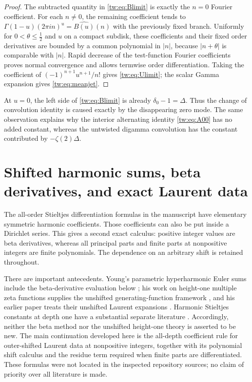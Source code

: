 \documentclass[11pt,letterpaper]{article}
\numberwithin{equation}{section}
\theoremstyle{plain}
\theoremstyle{definition}
\theoremstyle{remark}
\begin{document}
\begin{proof}
The subtracted quantity in \eqref{tw:eq:Blimit} is exactly the
$n=0$ Fourier coefficient. For each $n\ne0$, the remaining
coefficient tends to
$\Gamma(1-u)(2\pi in)^u=\widehat{B(u)}(n)$ with the previously
fixed branch. Uniformly for $0<\theta\le\tfrac12$ and $u$ on a
compact subdisk, these coefficients and their fixed order
derivatives are bounded by a common polynomial in $|n|$, because
$|n+\theta|$ is comparable with $|n|$. Rapid decrease of the
test-function Fourier coefficients proves normal convergence and
allows termwise order differentiation. Taking the coefficient of
$(-1)^{n+1}u^{n+1}/n!$ gives \eqref{tw:eq:Ulimit}; the scalar
Gamma expansion gives \eqref{tw:eq:meanjet}.
\end{proof}

At $u=0$, the left side of \eqref{tw:eq:Blimit} is already
$\delta_0-1=\Delta$. Thus the change of convolution identity is
caused exactly by the disappearing zero mode. The same observation
explains why the interior alternating identity
\eqref{tw:eq:A00} has no added constant, whereas the untwisted
digamma convolution has the constant contributed by
$-\zeta(2)\Delta$.



\section{Shifted harmonic sums, beta derivatives, and exact Laurent data}
\label{harm:sec:main}

The all-order Stieltjes differentiation formulas in the manuscript have
elementary symmetric harmonic coefficients.  Those coefficients can also
be put inside a Dirichlet series.  This gives a second exact calculus:
positive integer values are beta derivatives, whereas all principal parts
and finite parts at nonpositive integers are finite polynomials.  The
dependence on an arbitrary shift is retained throughout.

There are important antecedents.  Young's parametric hyperharmonic Euler
sums include the beta-derivative evaluation below
\cite{Young2026}; his work on height-one multiple zeta functions supplies
the unshifted generating-function framework \cite{Young2024}, and his
earlier paper treats their unshifted Laurent expansions \cite{Young2023}.  Harmonic
Stieltjes constants at depth one have a substantial separate literature
\cite{HarmonicStieltjes2023}.  Accordingly, neither the beta method nor the
unshifted height-one theory is asserted to be new.  The main continuation
developed here is the all-depth coefficient rule for outer-shifted
Laurent data at nonpositive integers, together with its polynomial shift
calculus and the residue term required when finite parts are
differentiated.  These formulas were not located in the inspected
repository sources; no claim of priority over all literature is made.
\end{document}

